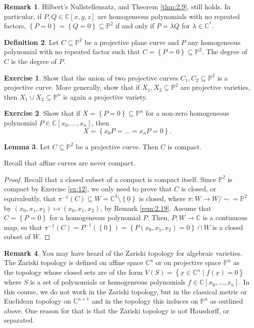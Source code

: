 \documentclass{article}
\newcommand{\C}{\mathbb{C}}
\renewcommand{\P}{\mathbb{P}}
\newcommand{\rb}[1]{\left( #1 \right)}
\renewcommand{\sb}[1]{\left[ #1 \right]}
\newcommand{\cb}[1]{\left\{ #1 \right\}}
\theoremstyle{definition}\newtheorem{definition}{Definition}[section]
\theoremstyle{definition}\newtheorem{notation}[definition]{Notation}
\theoremstyle{definition}\newtheorem{remark}[definition]{Remark}
\theoremstyle{definition}\newtheorem{example}[definition]{Example}
\theoremstyle{definition}\newtheorem{fact}{Fact}
\theoremstyle{definition}\newtheorem{exercise}{Exercise}
\newtheorem{lemma}[definition]{Lemma}
\begin{document}
\begin{remark}
\label{rem:4.12}
Hilbert's Nullstellensatz, and Theorem \ref{thm:2.9}, still holds. In particular, if $ P, Q \in \C\sb{x, y, z} $ are homogeneous polynomials with no repeated factors, $ \cb{P = 0} = \cb{Q = 0} \subseteq \P^2 $ if and only if $ P = \lambda Q $ for $ \lambda \in \C^* $.
\end{remark}

\begin{definition}
Let $ C \subseteq \P^2 $ be a projective plane curve and $ P $ any homogeneous polynomial with no repeated factor such that $ C = \cb{P = 0} \subseteq \P^2 $. The degree of $ C $ is the degree of $ P $.
\end{definition}

\begin{exercise}
Show that the union of two projective curves $ C_1, C_2 \subseteq \P^2 $ is a projective curve. More generally, show that if $ X_1, X_2 \subseteq \P^2 $ are projective varieties, then $ X_1 \cup X_2 \subseteq \P^n $ is again a projective variety.
\end{exercise}

\begin{exercise}
Show that if $ X = \cb{P = 0} \subseteq \P^n $ for a non-zero homogeneous polynomial $ P \in \C\sb{x_0, \dots, x_n} $, then
$$ X = \cb{x_0P = \dots = x_nP = 0}. $$
\end{exercise}

\begin{lemma}
Let $ C \subseteq \P^2 $ be a projective curve. Then $ C $ is compact.
\end{lemma}

Recall that affine curves are never compact.

\begin{proof}
Recall that a closed subset of a compact is compact itself. Since $ \P^2 $ is compact by Exercise \ref{ex:12}, we only need to prove that $ C $ is closed, or equivalently, that $ \pi^{-1}\rb{C} \subseteq W = \C^3 \setminus \cb{\underline{0}} $ is closed, where $ \pi : W \to W / \sim = \P^2 $ by $ \rb{x_0, x_1, x_2} \mapsto \rb{x_0, x_1, x_2} $, by Remark \ref{rem:2.19}. Assume that $ C = \cb{P = 0} $ for a homogeneous polynomial $ P $. Then, $ P : W \to \C $ is a continuous map, so that $ \pi^{-1}\rb{C} = P^{-1}\rb{\cb{0}} = \cb{P\rb{x_0, x_1, x_2} = 0} \cap W $ is a closed subset of $ W $.
\end{proof}

\begin{remark}
You may have heard of the Zariski topology for algebraic varieties. The Zariski topology is defined on affine space $ \C^n $ or on projective space $ \P^n $ as the topology whose closed sets are of the form $ V\rb{S} = \cb{\underline{x} \in \C^n \mid f\rb{\underline{x}} = 0} $ where $ S $ is a set of polynomials or homogeneous polynomials $ f \in \C\sb{x_0, \dots, x_n} $. In this course, we do not work in the Zariski topology, but in the classical metric or Euclidean topology on $ \C^{n + 1} $ and in the topology this induces on $ \P^n $ as outlined above. One reason for that is that the Zariski topology is not Hausdorff, or separated.
\end{remark}
\end{document}
